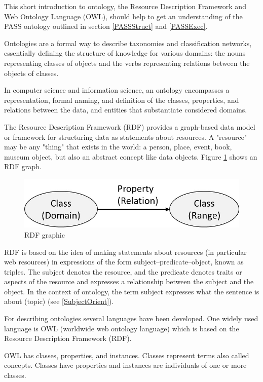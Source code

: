 This short introduction to ontology, the Resource Description Framework and Web Ontology Language (OWL), should help to get an understanding of the PASS ontology outlined in section \ref{PASSStruct} and \ref{PASSExec}.

Ontologies are a formal way to describe taxonomies and classification networks, essentially defining the structure of knowledge for various domains: the nouns representing classes of objects and the verbs representing relations between the objects of classes.

In computer science and information science, an ontology encompasses a representation, formal naming, and definition of the classes, properties, and relations between the data, and entities that substantiate considered domains.

The Resource Description Framework (RDF) provides a graph-based data model or framework for structuring data as statements about resources. A "resource" may be any "thing" that exists in the world: a person, place, event, book, museum object, but also an abstract concept like data objects. Figure \ref{fig:classes-properties}  shows an RDF graph.

\begin{figure}[h]
	\centering
	\includegraphics[width=0.6\linewidth]{Figures/Ontology/Introduction/Classes-Properties}
	\caption[RDF graphic]{RDF graphic}
	\label{fig:classes-properties}
\end{figure}

RDF is based on the idea of making statements about resources (in particular web resources) in expressions of the form subject–predicate–object, known as triples. The subject denotes the resource, and the predicate denotes traits or aspects of the resource and expresses a relationship between the subject and the object. In the context of ontology, the term subject expresses what the sentence is about (topic) (see \ref{SubjectOrient}).

For describing ontologies several languages have been developed. One widely used language is OWL (worldwide web ontology language) which is based on the Resource Description Framework (RDF).

OWL has classes, properties, and instances. Classes represent terms also called concepts. Classes have properties and instances are individuals of one or more classes.

